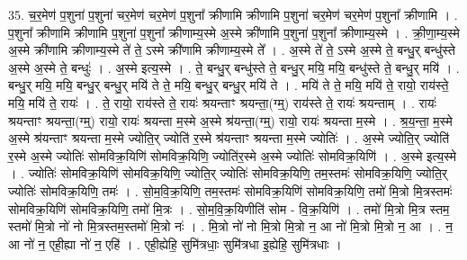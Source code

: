 \documentclass[17pt]{extarticle}
\begin{document}
35. च॒र॒मेण॑ प॒शुना॑ प॒शुना॑ चर॒मेण॑ चर॒मेण॑ प॒शुना᳚ क्रीणामि क्रीणामि प॒शुना॑ चर॒मेण॑ चर॒मेण॑ प॒शुना᳚ क्रीणामि । . प॒शुना᳚ क्रीणामि क्रीणामि प॒शुना॑ प॒शुना᳚ क्रीणाम्य॒स्मे अ॒स्मे क्री॑णामि प॒शुना॑ प॒शुना᳚ क्रीणाम्य॒स्मे । . क्री॒णा॒म्य॒स्मे अ॒स्मे क्री॑णामि क्रीणाम्य॒स्मे ते॑ ते॒ ऽस्मे क्री॑णामि क्रीणाम्य॒स्मे ते᳚ । . अ॒स्मे ते॑ ते॒ ऽस्मे अ॒स्मे ते॒ बन्धु॒र् बन्धु॑स्ते अ॒स्मे अ॒स्मे ते॒ बन्धुः॑ । . अ॒स्मे इत्य॒स्मे । . ते॒ बन्धु॒र् बन्धु॑स्ते ते॒ बन्धु॒र् मयि॒ मयि॒ बन्धु॑स्ते ते॒ बन्धु॒र् मयि॑ । . बन्धु॒र् मयि॒ मयि॒ बन्धु॒र् बन्धु॒र् मयि॑ ते ते॒ मयि॒ बन्धु॒र् बन्धु॒र् मयि॑ ते । . मयि॑ ते ते॒ मयि॒ मयि॑ ते॒ रायो॒ राय॑स्ते॒ मयि॒ मयि॑ ते॒ रायः॑ । . ते॒ रायो॒ राय॑स्ते ते॒ रायः॑ श्रयन्ताꣳ श्रयन्ता॒(ग्म्॒) राय॑स्ते ते॒ रायः॑ श्रयन्ताम् । . रायः॑ श्रयन्ताꣳ श्रयन्ता॒(ग्म्॒) रायो॒ रायः॑ श्रयन्ता म॒स्मे अ॒स्मे श्र॑यन्ता॒(ग्म्॒) रायो॒ रायः॑ श्रयन्ता म॒स्मे । . श्र॒य॒न्ता॒ म॒स्मे अ॒स्मे श्र॑यन्ताꣳ श्रयन्ता म॒स्मे ज्योति॒र् ज्योति॑ र॒स्मे श्र॑यन्ताꣳ श्रयन्ता म॒स्मे ज्योतिः॑ । . अ॒स्मे ज्योति॒र् ज्योति॑ र॒स्मे अ॒स्मे ज्योतिः॑ सोमविक्र॒यिणि॑ सोमविक्र॒यिणि॒ ज्योति॑र॒स्मे अ॒स्मे ज्योतिः॑ सोमविक्र॒यिणि॑ । . अ॒स्मे इत्य॒स्मे । . ज्योतिः॑ सोमविक्र॒यिणि॑ सोमविक्र॒यिणि॒ ज्योति॒र् ज्योतिः॑ सोमविक्र॒यिणि॒ तम॒स्तमः॑ सोमविक्र॒यिणि॒ ज्योति॒र् ज्योतिः॑ सोमविक्र॒यिणि॒ तमः॑ । . सो॒म॒वि॒क्र॒यिणि॒ तम॒स्तमः॑ सोमविक्र॒यिणि॑ सोमविक्र॒यिणि॒ तमो॑ मि॒त्रो मि॒त्रस्तमः॑ सोमविक्र॒यिणि॑ सोमविक्र॒यिणि॒ तमो॑ मि॒त्रः । . सो॒म॒वि॒क्र॒यिणीति॑ सोम - वि॒क्र॒यिणि॑ । . तमो॑ मि॒त्रो मि॒त्र स्तम॒ स्तमो॑ मि॒त्रो नो॑ नो मि॒त्रस्तम॒स्तमो॑ मि॒त्रो नः॑ । . मि॒त्रो नो॑ नो मि॒त्रो मि॒त्रो न॒ आ नो॑ मि॒त्रो मि॒त्रो न॒ आ । . न॒ आ नो॑ न॒ एही॒ह्या नो॑ न॒ एहि॑ । . एही॒ह्येहि॒ सुमि॑त्रधाः॒ सुमि॑त्रधा इ॒ह्येहि॒ सुमि॑त्रधाः । \newline
\end{document}
